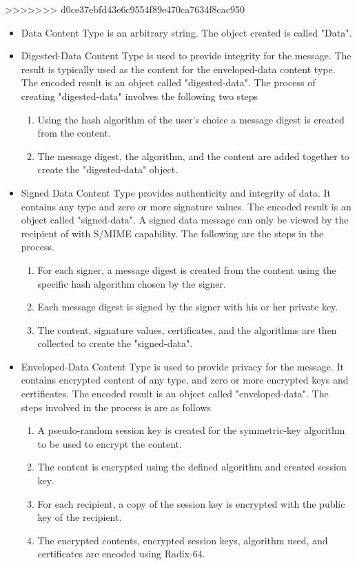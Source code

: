 >>>>>>> d0ce37ebfd43e6c9554f89e470ca7634f8cac950
\begin{itemize}
\item Data Content Type is an arbitrary string.  The object created is called "Data".
\item Digested-Data Content Type is used to provide integrity for the message. The result is typically used as the content for the enveloped-data content type.  The encoded result is an object called "digested-data".  The process of creating "digested-data" involves the following two steps
\begin{enumerate}
\item Using the hash algorithm of the user's choice a message digest is created from the content.
\item The message digest, the algorithm, and the content are added together to create the "digested-data" object.
\end{enumerate}
\item Signed Data Content Type provides authenticity and integrity of data. It contains any type and zero or more signature values. The encoded result is an object called "signed-data". A signed data message can only be viewed by the recipient of with S/MIME capability. The following are the steps in the process.
\begin{enumerate}
\item For each signer, a message digest is created from the content using the specific hash algorithm chosen by the signer.
\item Each message digest is signed by the signer with his or her private key.
\item The content, signature values, certificates, and the algorithms are then collected to create the "signed-data".
\end{enumerate}
\item Enveloped-Data Content Type is used to provide privacy for the message. It contains encrypted content of any type, and zero or more encrypted keys and certificates. The encoded result is an object called "enveloped-data". The steps involved in the process is are as follows
\begin{enumerate}
\item A pseudo-random session key is created for the symmetric-key algorithm to be used to encrypt the content.
\item The content is encrypted using the defined algorithm and created session key.
\item For each recipient, a copy of the session key is encrypted with the public key of the recipient.
\item The encrypted contents, encrypted session keys, algorithm used, and certificates are encoded using Radix-64.
\end{enumerate}
\end{itemize}
